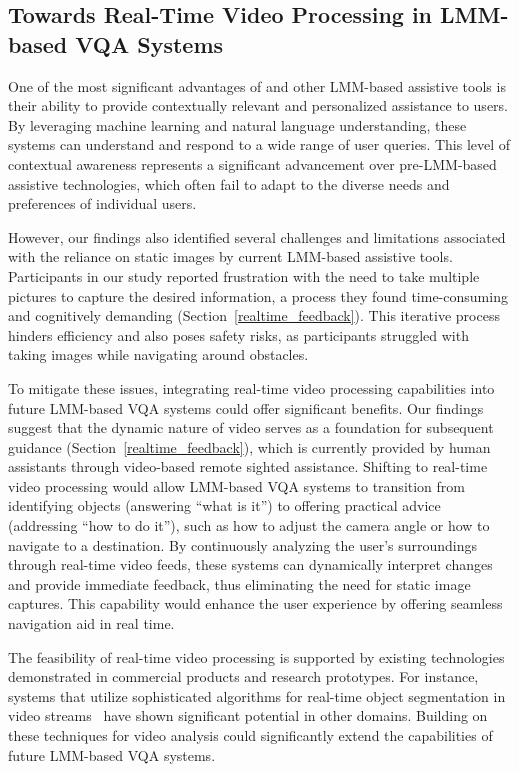 \subsection{Towards Real-Time Video Processing in LMM-based VQA Systems}


One of the most significant advantages of \bma{} and other LMM-based assistive tools is their ability to provide contextually relevant and personalized assistance to users. By leveraging machine learning and natural language understanding, these systems can understand and respond to a wide range of user queries. This level of contextual awareness represents a significant advancement over pre-LMM-based assistive technologies, which often fail to adapt to the diverse needs and preferences of individual users.


However, our findings also identified several challenges and limitations associated with the reliance on static images by current LMM-based assistive tools. 
Participants in our study reported frustration with the need to take multiple pictures to capture the desired information, a process they found time-consuming and cognitively demanding (Section~\ref{realtime_feedback}). This iterative process hinders efficiency and also poses safety risks, as participants struggled with taking images while navigating around obstacles.


To mitigate these issues, integrating real-time video processing capabilities into future LMM-based VQA systems could offer significant benefits. 
% 
Our findings suggest that the dynamic nature of video serves as a foundation for subsequent guidance (Section~\ref{realtime_feedback}), which is currently provided by human assistants through video-based remote sighted assistance.
% 
Shifting to real-time video processing would allow LMM-based VQA systems to transition from identifying objects (answering ``what is it'') to offering practical advice (addressing ``how to do it''), such as how to adjust the camera angle or how to navigate to a destination.
% 
By continuously analyzing the user's surroundings through real-time video feeds, these systems can dynamically interpret changes and provide immediate feedback, thus eliminating the need for static image captures. This capability would enhance the user experience by offering seamless navigation aid in real time. 


The feasibility of real-time video processing is supported by existing technologies demonstrated in commercial products and research prototypes. For instance, systems that utilize sophisticated algorithms for real-time object segmentation in video streams~\cite{wang2021swiftnet} have shown significant potential in other domains. Building on these techniques for video analysis could significantly extend the capabilities of future LMM-based VQA systems. 


